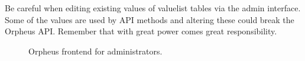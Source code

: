 \documentclass[british, 12pt]{article}
\begin{document}
\begin{warn}
 Be careful when editing existing values of valuelist tables via the admin interface. Some of the values are used by API methods and altering these could break the Orpheus API. Remember that with great power comes great responsibility.
\end{warn}


\begin{figure}
  \caption{Orpheus frontend for administrators.}
  \label{fig-admin}
\end{figure}
\end{document}
